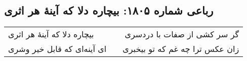 \begin{center}
\section*{رباعی شماره ۱۸۰۵: بیچاره دلا که آینهٔ هر اثری}
\label{sec:1805}
\begin{longtable}{l p{0.5cm} r}
بیچاره دلا که آینهٔ هر اثری
&&
گر سر کشی از صفات با دردسری
\\
ای آینه‌ای که قابل خیر وشری
&&
زان عکس ترا چه غم که تو بیخبری
\\
\end{longtable}
\end{center}
